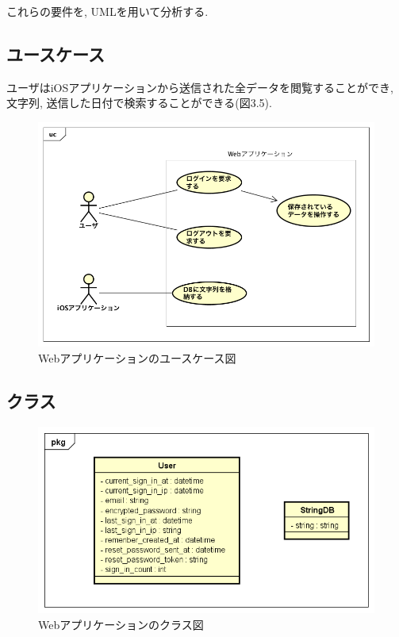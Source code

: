 これらの要件を, UMLを用いて分析する.

\subsection{ユースケース}
ユーザはiOSアプリケーションから送信された全データを閲覧することができ, 文字列, 送信した日付で検索することができる(図3.5).

\begin{figure}
\begin{center}
\includegraphics[width=16cm]{fig/usecase_web.png}
\end{center}
\caption{Webアプリケーションのユースケース図}
\end{figure}

\newpage

\subsection{クラス}

\begin{figure}
\begin{center}
\includegraphics[width=16cm]{fig/class_web.png}
\end{center}
\caption{Webアプリケーションのクラス図}
\end{figure}

